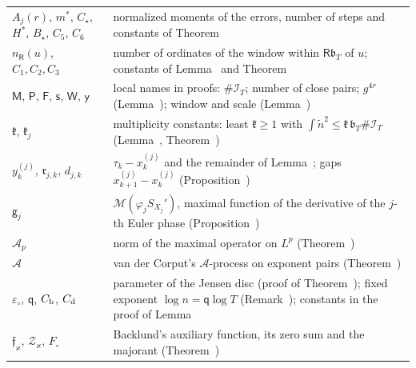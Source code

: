 \documentclass[preprint,12pt]{elsarticle}
\makeatletter
\let\CG@origref\ref
\newcommand{\CG@gettip}[1]{\@ifundefined{CGTip@#1}{Reference: #1}{\csname CGTip@#1\endcsname}}
\DeclareRobustCommand{\CGref}[1]{\pdftooltip{\CG@origref{#1}}{\CG@gettip{#1}}}
\numberwithin{equation}{section}
\theoremstyle{plain}
\theoremstyle{definition}
\theoremstyle{remark}
\newcommand{\IT}{\mathcal I_T}
\makeatother
\begin{document}
\begin{center}
\begin{longtable}{p{}p{}}
$A_j(r)$, $m^*$, $C_\star$, $H^*$, $B_\star$, $C_5$, $C_6$ & normalized moments of the errors, number of steps and constants of Theorem~\CGref{thm:uniform_iteration}\\
$n_{\mathsf R}(u)$, $C_1,C_2,C_3$ & number of ordinates of the window within $\mathsf R\mathfrak b_T$ of $u$; constants of Lemma~\CGref{lem:zero_pairs} and Theorem~\CGref{thm:multiplicity_all}\\
$\mathsf M$, $\mathsf P$, $\mathsf F$, $\mathsf s$, $\mathsf W$, $\mathsf y$ & local names in proofs: $\#\IT$; number of close pairs; $g^{4r}$ (Lemma~\CGref{lem:sampling_rho}); window and scale (Lemma~\CGref{lem:maximal_primes})\\
$\mathfrak k$, $\mathfrak k_j$ & multiplicity constants: least $\mathfrak k\ge1$ with $\int\tilde n^2\le\mathfrak k\,\mathfrak b_T\#\IT$ (Lemma~\CGref{lem:sampling_rho}, Theorem~\CGref{thm:uniform_iteration})\\
$y^{(j)}_k$, $\mathfrak r_{j,k}$, $d_{j,k}$ & $\tau_k-x^{(j)}_k$ and the remainder of Lemma~\CGref{lem:second_identity}; gaps $x^{(j)}_{k+1}-x^{(j)}_k$ (Proposition~\CGref{prop:deformation})\\
$\mathsf g_j$ & $\mathcal M(\varphi_jS_{X_j}')$, maximal function of the derivative of the $j$-th Euler phase (Proposition~\CGref{prop:recursion})\\
$\mathcal A_p$ & norm of the maximal operator on $L^p$ (Theorem~\CGref{thm:known_maximal})\\
$\mathscr A$ & van der Corput\textquoteright s $\mathscr A$-process on exponent pairs (Theorem~\CGref{thm:known_exponents})\\
$\varepsilon_\circ$, $\mathsf q$, $C_{\rm b}$, $C_{\rm d}$ & parameter of the Jensen disc (proof of Theorem~\CGref{thm:envelope}); fixed exponent $\log n=\mathsf q\log T$ (Remark~\CGref{rem:transport}); constants in the proof of Lemma~\CGref{lem:higher_moments}\\
$\mathfrak f_\varkappa$, $\mathcal Z_\varkappa$, $F_\circ$ & Backlund's auxiliary function, its zero sum and the majorant (Theorem~\CGref{thm:known_backlund})\\
\end{longtable}
\end{center}
\end{document}
